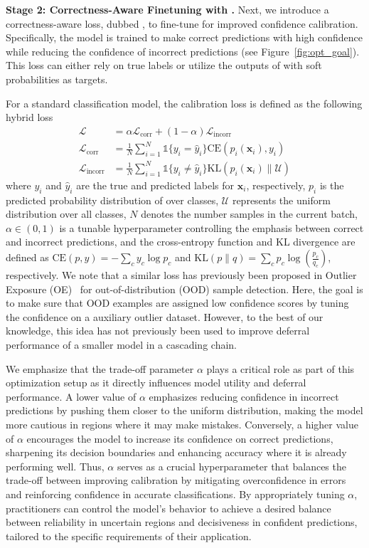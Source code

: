 \sloppy
\textbf{Stage 2: Correctness-Aware Finetuning with \loss.} Next, we introduce a correctness-aware loss, dubbed \loss, to fine-tune \smallmodel for improved confidence calibration. Specifically, the model is trained to make correct predictions with high confidence while reducing the confidence of incorrect predictions (see Figure~\ref{fig:opt_goal}). This loss can either rely on true labels or utilize the outputs of \bigmodel with soft probabilities as targets. 


For a standard classification model, the calibration loss is defined as the following hybrid loss
\begin{align}
\mathcal{L} &= \alpha \mathcal{L}_\text{corr} + (1 - \alpha) \mathcal{L}_\text{incorr} \\
\mathcal{L}_\text{corr} &= \frac{1}{N} \sum_{i=1}^{N} \mathds{1}\{ y_i = \hat{y}_i \} \text{CE}(p_i(\mathbf{x}_i), y_i) \\
\mathcal{L}_\text{incorr} &= \frac{1}{N} \sum_{i=1}^{N} \mathds{1}\{ y_i \neq \hat{y}_i \} \text{KL}\left(p_i(\mathbf{x}_i) \parallel \mathcal{U}\right)
\end{align}
where  \( y_i \) and \( \hat{y}_i \) are the true and predicted labels for $\mathbf{x}_i$, respectively, \( p_i \) is the predicted probability distribution of \smallmodel over classes, \( \mathcal{U} \) represents the uniform distribution over all classes, \( N \) denotes the number samples in the current batch, \( \alpha \in (0, 1) \) is a tunable hyperparameter controlling the emphasis between correct and incorrect predictions, and the cross-entropy function and KL divergence are defined as \( \text{CE}(p, y) = -\sum_{c} y_c \log p_c \) and \( \text{KL}(p \parallel q) = \sum_{c} p_c \log ( \frac{p_c}{q_c}) \), respectively. We note that a similar loss has previously been proposed in Outlier Exposure (OE)~\citep{hendrycks2018deep} for out-of-distribution (OOD) sample detection. Here, the goal is to make sure that OOD examples are assigned low confidence scores by tuning the confidence on a auxiliary outlier dataset. However, to the best of our knowledge, this idea has not previously been used to improve deferral performance of a smaller model in a cascading chain.

We emphasize that the trade-off parameter $\alpha$ plays a critical role as part of this optimization setup as it directly influences model utility and deferral performance. A lower value of \(\alpha\) emphasizes reducing confidence in incorrect predictions by pushing them closer to the uniform distribution, making the model more cautious in regions where it may make mistakes. Conversely, a higher value of \(\alpha\) encourages the model to increase its confidence on correct predictions, sharpening its decision boundaries and enhancing accuracy where it is already performing well. Thus, \(\alpha\) serves as a crucial hyperparameter that balances the trade-off between improving calibration by mitigating overconfidence in errors and reinforcing confidence in accurate classifications. By appropriately tuning \(\alpha\), practitioners can control the model’s behavior to achieve a desired balance between reliability in uncertain regions and decisiveness in confident predictions, tailored to the specific requirements of their application.

